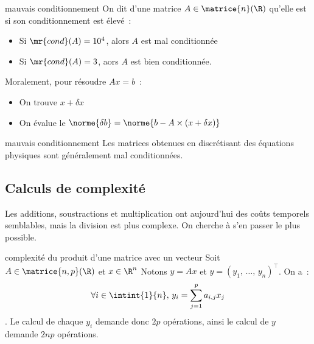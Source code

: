 \begin{definition}{}{mauvais conditionnement}
    On dit d'une matrice $A \in \matrice{n}(\R)$ qu'elle est  si son conditionnement est élevé~:
    \begin{itemize}
        \item Si $\mr{cond}(A) = 10^4$, alors $A$ est mal conditionnée
        \item Si $\mr{cond}(A) = 3$, aors $A$ est bien conditionnée.
    \end{itemize}
\end{definition}

Moralement, pour résoudre $Ax = b$~:
\begin{itemize}
    \item On trouve $x + \delta x$
    \item On évalue le  $\norme{\delta b} = \norme{b - A\times(x + \delta x)}$
\end{itemize}

\begin{remarque}{}{mauvais conditionnement}
    Les matrices obtenues en discrétisant des équations physiques sont généralement mal conditionnées.
\end{remarque}



\subsection{Calculs de complexité}
Les additions, soustractions et multiplication ont aujourd'hui des coûts temporels semblables, mais la division est plus complexe. On cherche à s'en passer le plus possible.

\begin{exemple}{}{complexité du produit d'une matrice avec un vecteur}
    Soit $A \in \matrice{n,p}(\R)$ et $x \in \R^n$
    Notons $y = Ax$ et $y = (y_1,\, \dots,\, y_n)^\top$. On a~:
    $$\forall i \in \intint{1}{n},\, y_i = \sum_{j=1}^p a_{i,j} x_j$$.
    Le calcul de chaque $y_i$ demande donc $2p$ opérations, ainsi le calcul de $y$ demande $2np$ opérations.
    
\end{exemple}

